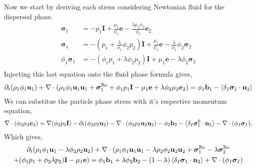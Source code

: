 Now we start by deriving each stress considering Newtonian fluid for the dispersed phase. 
\begin{align*}
    \bm{\sigma}_1 
    &= - p_1 \textbf{I}
    + \frac{\mu_1 }{\phi_1} \textbf{e}
    - \frac{\lambda \mu_2 \phi_2}{\phi_1} \textbf{e}_2\\
    \bm{\sigma}_1 
    &= - \left(p_1 + \frac{\lambda }{\phi_1}\phi_2 p_2\right) \textbf{I}
    + \frac{\mu_1}{\phi_1} \textbf{e}
    - \frac{\lambda }{\phi_1} \phi_2 \bm{\sigma}_2 \\
    \phi_1 \bm{\sigma}_1 
    &= - (\phi_1 p_1+ \lambda \phi_2 p_2) \textbf{I}
    + \mu_1 \textbf{e}
    - \lambda \phi_2 \bm{\sigma}_2\\
\end{align*}
Injecting this last equation onto the fluid phase formula gives, 
\begin{align*}
    \partial_t (\rho_1\phi_1 \textbf{u}_1 )
    + \mathbf{\nabla} \cdot (\rho_1\phi_1 \textbf{u}_1  \textbf{u}_1
    + \bm{\sigma}^\text{Re}_1 
    + \phi_1 p_1 \textbf{I}
    - \mu_1 \textbf{e}
    + \lambda \phi_2 \mu_2 \bm{e}_2)
    &= 
    \phi_1 \textbf{b}_1
    - \left<\delta_I \bm{\sigma}_1 \cdot \textbf{n}_2\right> \\
\end{align*}
We can substitue the particle phase stress with it's respective momentum equation,
\begin{equation*}    
\mathbf{\nabla} \cdot (\phi_2 \mu_2 \bm{e}_2)
=  
\mathbf{\nabla} (\phi_2 p_2 \textbf{I})
-\partial_t (\phi_2\rho_2 \textbf{u}_2)
- \mathbf{\nabla} \cdot (\phi_2\rho_2 \textbf{u}_2 \textbf{u}_2)
- \phi_2 \textbf{b}_2 
- \left<\delta_I
    \bm{\sigma}_1^0
\cdot \textbf{n}_2\right>
- \mathbf{\nabla} \cdot (\phi_I \bm{\sigma}_I) ,
\end{equation*}
Which gives, 
\begin{multline*}
    \partial_t (\rho_1\phi_1 \textbf{u}_1 -\lambda \phi_2 \rho_2 \textbf{u}_2  )
    + \mathbf{\nabla} \cdot (
        \rho_1\phi_1 \textbf{u}_1  \textbf{u}_1
        - \lambda\rho_2\phi_2 \textbf{u}_2  \textbf{u}_2
    + \bm{\sigma}^\text{Re}_1 - \lambda \bm{\sigma}^\text{Re}_2 \\
    + (\phi_1 p_1 + \phi_2 \lambda p_2) \textbf{I}
    - \mu_1 \textbf{e})
    = 
    \phi_1  \textbf{b}_1
    + \lambda \phi_2  \textbf{b}_2
    - (1-\lambda)\left<\delta_I \bm{\sigma}_1 \cdot \textbf{n}_2\right>
    + \mathbf{\nabla} \cdot (\phi_I \bm{\sigma}_I) \\
\end{multline*}


